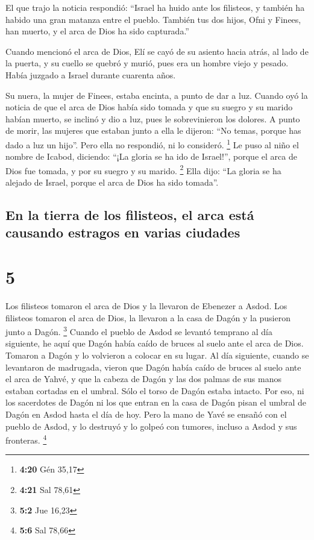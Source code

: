  El que trajo la noticia respondió: ``Israel ha huido
ante los filisteos, y también ha habido una gran matanza entre el
pueblo. También tus dos hijos, Ofni y Finees, han muerto, y el arca de
Dios ha sido capturada.''

 Cuando mencionó el arca de Dios, Elí se cayó de su
asiento hacia atrás, al lado de la puerta, y su cuello se quebró y
murió, pues era un hombre viejo y pesado. Había juzgado a Israel durante
cuarenta años.

 Su nuera, la mujer de Finees, estaba encinta, a punto de
dar a luz. Cuando oyó la noticia de que el arca de Dios había sido
tomada y que su suegro y su marido habían muerto, se inclinó y dio a
luz, pues le sobrevinieron los dolores.  A punto de
morir, las mujeres que estaban junto a ella le dijeron: ``No temas,
porque has dado a luz un hijo''. Pero ella no respondió, ni lo
consideró. \footnote{\textbf{4:20} Gén 35,17}  Le puso al
niño el nombre de Icabod, diciendo: ``¡La gloria se ha ido de Israel!'',
porque el arca de Dios fue tomada, y por su suegro y su marido.
\footnote{\textbf{4:21} Sal 78,61}  Ella dijo: ``La
gloria se ha alejado de Israel, porque el arca de Dios ha sido tomada''.

\hypertarget{en-la-tierra-de-los-filisteos-el-arca-estuxe1-causando-estragos-en-varias-ciudades}{%
\subsection{En la tierra de los filisteos, el arca está causando
estragos en varias
ciudades}\label{en-la-tierra-de-los-filisteos-el-arca-estuxe1-causando-estragos-en-varias-ciudades}}

\hypertarget{section-4}{%
\section{5}\label{section-4}}

 Los filisteos tomaron el arca de Dios y la llevaron de
Ebenezer a Asdod.  Los filisteos tomaron el arca de Dios,
la llevaron a la casa de Dagón y la pusieron junto a Dagón. \footnote{\textbf{5:2}
  Jue 16,23}  Cuando el pueblo de Asdod se levantó
temprano al día siguiente, he aquí que Dagón había caído de bruces al
suelo ante el arca de Dios. Tomaron a Dagón y lo volvieron a colocar en
su lugar.  Al día siguiente, cuando se levantaron de
madrugada, vieron que Dagón había caído de bruces al suelo ante el arca
de Yahvé, y que la cabeza de Dagón y las dos palmas de sus manos estaban
cortadas en el umbral. Sólo el torso de Dagón estaba intacto.
 Por eso, ni los sacerdotes de Dagón ni los que entran en
la casa de Dagón pisan el umbral de Dagón en Asdod hasta el día de hoy.
 Pero la mano de Yavé se ensañó con el pueblo de Asdod, y
lo destruyó y lo golpeó con tumores, incluso a Asdod y sus fronteras.
\footnote{\textbf{5:6} Sal 78,66}

